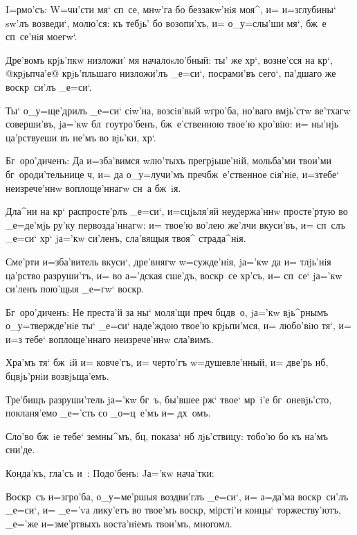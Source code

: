 
I=рмо'съ: W=чи'сти мя` сп~се, мнw'га бо беззакw'нiя 
моя^, и= и=з\ъ глубины` sw'лъ возведи`, молю'ся: къ 
тебjь' бо возопи'хъ, и= о_у=слы'ши мя`, бж~е сп~се'нiя 
моегw`.

Дре'вомъ крjь'пкw низложи' мя началоsло'бный: ты' же 
хр`, возне'сся на кр`, @крjьпча'е@ 
{крjь'пльшаго} низложи'лъ _е=си`, посрами'въ сего`, 
па'дшаго же воскр~си'лъ _е=си`.

Ты` о_у=ще'дрилъ _е=си` сiw'на, возсiя'вый w\т гро'ба, 
но'ваго вмjь'стw ве'тхагw соверши'въ, jа='кw 
бл~гоутро'бенъ, бж~е'ственною твое'ю кро'вiю: и= ны'нjь 
ца'рствуеши въ не'мъ во вjь'ки, хр`.

Бг~оро'диченъ: Да и=зба'вимся w\т лю'тыхъ 
прегрjьше'нiй, мольба'ми твои'ми бг~ороди'тельнице 
ч, и= да о_у=лучи'мъ преч бж~е'ственное 
сiя'нiе, и=з\ъ тебе` неизрече'ннw воплоще'ннагw сн~а 
бж~iя.


Дла^ни на кр` распросте'рлъ _е=си`, и=сцjьля'яй 
неудержа'ннw просте'ртую во _е=де'мjь ру'ку 
первозда'ннагw: и= твое'ю во'лею же'лчи вкуси'въ, и= 
сп~слъ _е=си` хр` jа='кw си'ленъ, сла'вящыя твоя^ 
страда^нiя.

Сме'рти и=зба'витель вкуси`, дре'внягw w=сужде'нiя, 
jа='кw да и= тлjь'нiя ца'рство разруши'тъ, и= во а='дская 
сше'дъ, воскр~се хр'съ, и= сп~се` jа='кw си'ленъ 
пою'щыя _е=гw` воскр.

Бг~оро'диченъ: Не преста'й за ны` моля'щи преч 
бц дв~о, jа='кw вjь^рнымъ о_у=твержде'нiе ты` _е=си` 
наде'ждою твое'ю крjьпи'мся, и= любо'вiю тя`, и= и=з\ъ 
тебе` воплоще'ннаго неизрече'ннw сла'вимъ.


Хра'мъ тя` бж~iй и= ковче'гъ, и= черто'гъ 
w=душевле'нный, и= две'рь нб, бц вjь'рнiи 
возвjьща'емъ.

Тре'бищъ разруши'тель jа='кw бг~ъ, бы'вшее рж` 
твое` мр~i'е бг~оневjь'сто, покланя'емо _е='сть со 
_о=ц~е'мъ и= дх~омъ.

Сло'во бж~iе тебе` земны^мъ, бц, показа` нб 
лjь'ствицу: тобо'ю бо къ на'мъ сни'де.

Конда'къ, гла'съ и~: Подо'бенъ: Jа='кw нача'тки:

Воскр~съ и=з\ъ гро'ба, о_у=ме'ршыя воздви'глъ _е=си`, 
и= а=да'ма воскр~си'лъ _е=си`, и= _е='vа лику'етъ во 
твое'мъ воскр, мiрстi'и концы` торжеству'ютъ, _е='же 
и=з\ъ ме'ртвыхъ воста'нiемъ твои'мъ, многомл.

